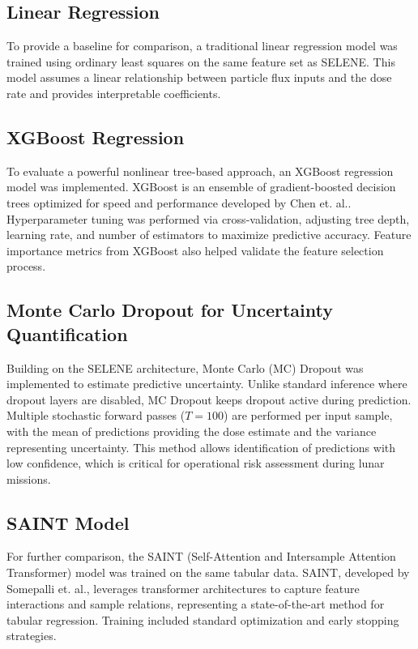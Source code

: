 \documentclass[conference]{IEEEtran}
\begin{document}
\subsection{Linear Regression}
To provide a baseline for comparison, a traditional linear regression model was trained using ordinary least squares on the same feature set as SELENE. This model assumes a linear relationship between particle flux inputs and the dose rate and provides interpretable coefficients.

\subsection{XGBoost Regression}
To evaluate a powerful nonlinear tree-based approach, an XGBoost regression model was implemented. XGBoost is an ensemble of gradient-boosted decision trees optimized for speed and performance developed by Chen et. al.\cite{chen2016xgboost}. Hyperparameter tuning was performed via cross-validation, adjusting tree depth, learning rate, and number of estimators to maximize predictive accuracy. Feature importance metrics from XGBoost also helped validate the feature selection process.

\subsection{Monte Carlo Dropout for Uncertainty Quantification}
Building on the SELENE architecture, Monte Carlo (MC) Dropout was implemented to estimate predictive uncertainty. Unlike standard inference where dropout layers are disabled, MC Dropout keeps dropout active during prediction. Multiple stochastic forward passes ($T=100$) are performed per input sample, with the mean of predictions providing the dose estimate and the variance representing uncertainty. This method allows identification of predictions with low confidence, which is critical for operational risk assessment during lunar missions.

\subsection{SAINT Model}
For further comparison, the SAINT (Self-Attention and Intersample Attention Transformer) model was trained on the same tabular data. SAINT, developed by Somepalli et. al.\cite{somepalli2021saint}, leverages transformer architectures to capture feature interactions and sample relations, representing a state-of-the-art method for tabular regression. Training included standard optimization and early stopping strategies.
\end{document}
